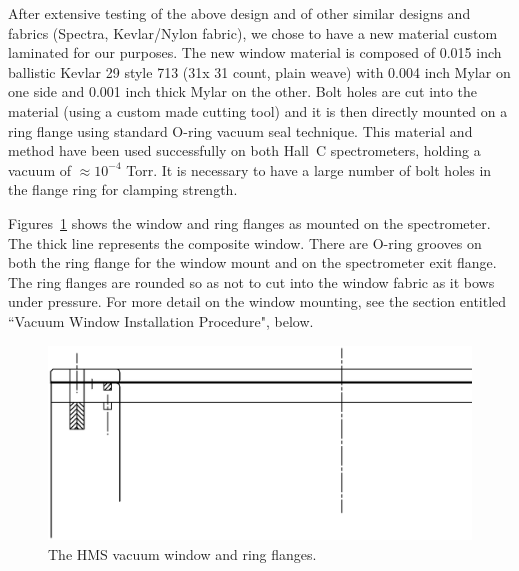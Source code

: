 {\begin{obsolete}
After extensive testing of the above design
and of other similar designs and fabrics (Spectra, Kevlar/Nylon fabric),
we chose to have a new
material custom laminated for our purposes. The new window material is
composed of 0.015 inch ballistic Kevlar 29 style 713 (31x 31 count,
plain weave)
with 0.004 inch Mylar on
one side
and 0.001 inch thick Mylar on the other. Bolt holes are cut into the material
(using a custom made cutting tool) and it is then directly
mounted on a ring flange using standard O-ring vacuum
seal technique.  This material and
method have
been used successfully on both Hall~C spectrometers, holding a vacuum of
$\approx 10^{-4}$ Torr. It is necessary to have a large number of bolt holes in the flange ring
for clamping strength.
\end{obsolete}

Figures~\ref{fig:hms_window} shows the
window and ring flanges as mounted on the spectrometer. The thick
line represents the composite window. There are O-ring grooves on both the
ring flange for the window mount and on the spectrometer exit flange.
The ring flanges are rounded so as not to cut into the window fabric as
it bows under pressure.
For more detail on the window mounting, see
the section entitled ``Vacuum Window Installation Procedure", below.

\begin{figure}
\includegraphics[width=6in]{figHMSwindow}
\caption{The HMS vacuum window and ring flanges. \label{fig:hms_window}}
\end{figure}

}
